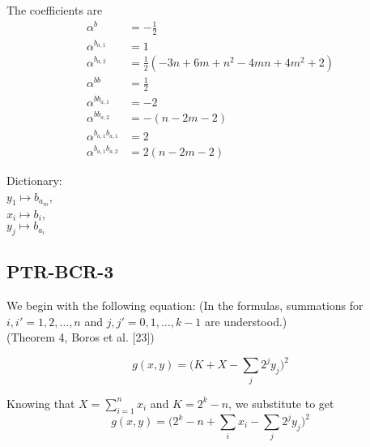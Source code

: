 \documentclass[a4paper,11pt]{article}
\begin{document}
\noindent The coefficients are
\begin{subequations}
\begin{align}
\alpha^b &= -\frac{1}{2}\\
\alpha^{b_{a,1}} &= 1\\
\alpha^{b_{a,2}} &= \frac{1}{2}(-3n + 6m + n^2 - 4mn + 4m^2 + 2)\\
\alpha^{bb} &= \frac{1}{2}\\
\alpha^{bb_{a,1}} &= -2\\
\alpha^{bb_{a,2}} &= -(n-2m-2)\\
\alpha^{b_{a,1}b_{a,1}} &= 2\\
\alpha^{b_{a,1}b_{a,2}} &= 2(n-2m-2)
\end{align}
\end{subequations}

\noindent Dictionary:\\
$y_{1}\mapsto b_{a_m}$,\\
$x_i\mapsto b_i$,\\
$y_j\mapsto b_{a_i}$\\



\subsection{PTR-BCR-3} %

We begin with the following equation:
(In the formulas, summations for $i,i' = 1,2,\dots,n$ and $j,j' = 0,1,\dots,k-1$ are understood.)
\\(Theorem 4, Boros et al. [23])

\begin{equation}
  g(x,y) = \Big(K + X - \sum_{j} 2^j y_j\Big)^2
\end{equation}

\noindent Knowing that $X = \sum_{i=1}^n x_i$ and $K = 2^k - n$, we substitute to get
\begin{equation}
  g(x,y) = \Big(2^k - n + \sum_i x_i - \sum_{j} 2^j y_j\Big)^2
\end{equation}
\end{document}

